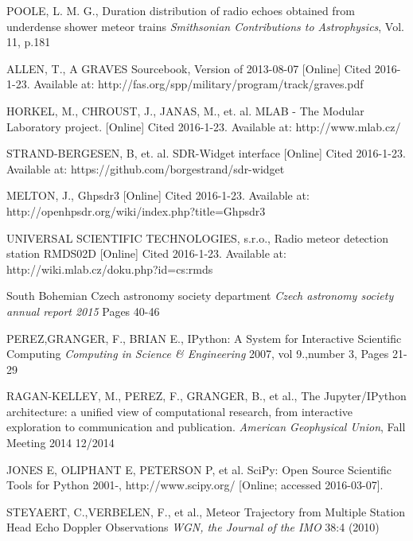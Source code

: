\documentclass[twoside]{ctuthesis}
\theoremstyle{plain}
\theoremstyle{definition}
\theoremstyle{note}
\begin{document}
\begin{thebibliography}{99}
POOLE, L. M. G.,
Duration distribution of radio echoes obtained from underdense shower meteor trains
\emph{Smithsonian Contributions to Astrophysics}, Vol. 11, p.181

ALLEN, T.,
A GRAVES Sourcebook, Version of 2013-08-07
[Online] Cited 2016-1-23. Available at: http://fas.org/spp/military/program/track/graves.pdf

HORKEL, M., CHROUST, J., JANAS, M., et. al. 
MLAB - The Modular Laboratory project.
[Online] Cited 2016-1-23. Available at: http://www.mlab.cz/

STRAND-BERGESEN, B, et. al.
SDR-Widget interface
[Online] Cited 2016-1-23. Available at: https://github.com/borgestrand/sdr-widget

MELTON, J.,
Ghpsdr3
[Online] Cited 2016-1-23. Available at: http://openhpsdr.org/wiki/index.php?title=Ghpsdr3

UNIVERSAL SCIENTIFIC TECHNOLOGIES, s.r.o.,  
Radio meteor detection station RMDS02D
[Online] Cited 2016-1-23. Available at: http://wiki.mlab.cz/doku.php?id=cs:rmds

South Bohemian Czech astronomy society department
\emph{Czech astronomy society annual report 2015}
Pages 40-46

PEREZ,GRANGER, F.,  BRIAN E.,
IPython: A System for Interactive Scientific Computing
\emph{Computing in Science \& Engineering}
2007, vol 9.,number 3,  Pages 21-29

RAGAN-KELLEY, M., PEREZ, F., GRANGER, B., et al.,
The Jupyter/IPython architecture: a unified view of computational research, from interactive exploration to communication and publication.
\emph{American Geophysical Union}, Fall Meeting 2014
12/2014

JONES E, OLIPHANT E, PETERSON P, et al.
SciPy: Open Source Scientific Tools for Python
2001-, http://www.scipy.org/ [Online; accessed 2016-03-07].

STEYAERT, C.,VERBELEN, F., et al.,
Meteor Trajectory from Multiple Station Head Echo Doppler Observations
\emph{WGN, the Journal of the IMO} 38:4 (2010)

\end{thebibliography}
\end{document}
